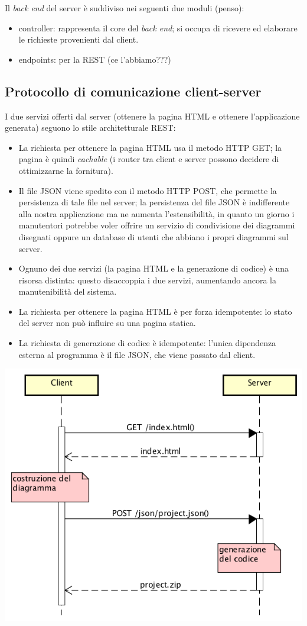 Il \emph{back end} del server è suddiviso nei seguenti due moduli (penso):
\begin{itemize}
	\item controller: rappresenta il core del \emph{back end}; si occupa di ricevere ed elaborare le richieste provenienti dal client.
	\item endpoints: per la REST (ce l'abbiamo???)
\end{itemize}



\subsection{Protocollo di comunicazione client-server} \label{sec:arch_proto}
I due servizi offerti dal server (ottenere la pagina HTML e ottenere l'applicazione generata) seguono lo stile architetturale REST:
\begin{itemize}
	\item La richiesta per ottenere la pagina HTML usa il metodo HTTP GET; la pagina è quindi \emph{cachable} (i router tra client e server possono decidere di ottimizzarne la fornitura).
	\item Il file JSON viene spedito con il metodo HTTP POST, che permette la persistenza di tale file nel server; la persistenza del file JSON è indifferente alla nostra applicazione ma ne aumenta l'estensibilità, in quanto un giorno i manutentori potrebbe voler offrire un servizio di condivisione dei diagrammi disegnati oppure un database di utenti che abbiano i propri diagrammi sul server.
	\item Ognuno dei due servizi (la pagina HTML e la generazione di codice) è una risorsa distinta: questo disaccoppia i due servizi, aumentando ancora la manutenibilità del sistema.
	\item La richiesta per ottenere la pagina HTML è per forza idempotente: lo stato del server non può influire su una pagina statica.
	\item La richiesta di generazione di codice è idempotente: l'unica dipendenza esterna al programma è il file JSON, che viene passato dal client.
\end{itemize}

\begin{center}
	\includegraphics[scale=0.66]{img/http}
\end{center}
